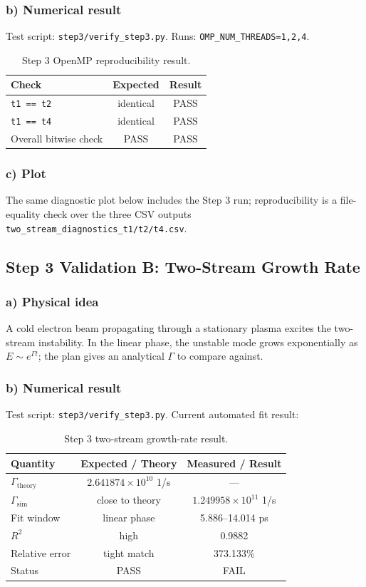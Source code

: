 \documentclass[11pt,a4paper]{article}
\begin{document}
\subsubsection*{b) Numerical result}
Test script: \texttt{step3/verify\_step3.py}. Runs: \texttt{OMP\_NUM\_THREADS=1,2,4}.

\begin{table}[H]
\centering
\begin{tabular}{lcc}
\toprule
Check & Expected & Result \\
\midrule
\texttt{t1 == t2} & identical & PASS \\
\texttt{t1 == t4} & identical & PASS \\
Overall bitwise check & PASS & PASS \\
\bottomrule
\end{tabular}
\caption{Step 3 OpenMP reproducibility result.}
\end{table}

\subsubsection*{c) Plot}
The same diagnostic plot below includes the Step 3 run; reproducibility is a file-equality check over the three CSV outputs \texttt{two\_stream\_diagnostics\_t1/t2/t4.csv}.

\subsection{Step 3 Validation B: Two-Stream Growth Rate}

\subsubsection*{a) Physical idea}
A cold electron beam propagating through a stationary plasma excites the two-stream instability. In the linear phase, the unstable mode grows exponentially as $E\sim e^{\Gamma t}$; the plan gives an analytical $\Gamma$ to compare against.

\subsubsection*{b) Numerical result}
Test script: \texttt{step3/verify\_step3.py}. Current automated fit result:
\begin{table}[H]
\centering
\begin{tabular}{lcc}
\toprule
Quantity & Expected / Theory & Measured / Result \\
\midrule
$\Gamma_{\mathrm{theory}}$ & $2.641874\times10^{10}$ 1/s & --- \\
$\Gamma_{\mathrm{sim}}$ & close to theory & $1.249958\times10^{11}$ 1/s \\
Fit window & linear phase & 5.886--14.014 ps \\
$R^2$ & high & 0.9882 \\
Relative error & tight match & 373.133\% \\
Status & PASS & FAIL \\
\bottomrule
\end{tabular}
\caption{Step 3 two-stream growth-rate result.}
\end{table}
\end{document}
